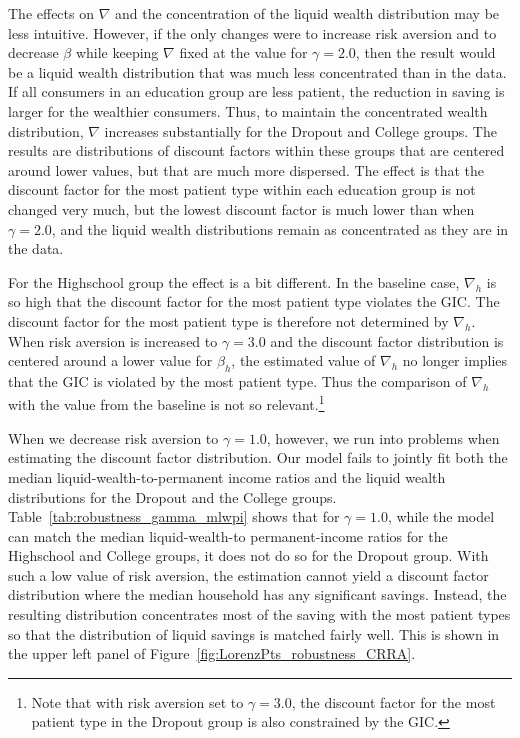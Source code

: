 \documentclass{econsocart}
\begin{document}
The effects on $\nabla$ and the concentration of the liquid wealth distribution may be less intuitive.
However, if the only changes were to increase risk aversion and to decrease $\beta$ while keeping $\nabla$ fixed at the value for $\gamma=2.0$, then the result would be a liquid wealth distribution that was much less concentrated than in the data.
If all consumers in an education group are less patient, the reduction in saving is larger for the wealthier consumers.
Thus, to maintain the concentrated wealth distribution, $\nabla$ increases substantially for the Dropout and College groups.
The results are distributions of discount factors within these groups that are centered around lower values, but that are much more dispersed.
The effect is that the discount factor for the most patient type within each education group is not changed very much, but the lowest discount factor is much lower than when $\gamma=2.0$, and the liquid wealth distributions remain as concentrated as they are in the data.

For the Highschool group the effect is a bit different.
In the baseline case, $\nabla_h$ is so high that the discount factor for the most patient type violates the GIC.
The discount factor for the most patient type is therefore not determined by $\nabla_h$.
When risk aversion is increased to $\gamma=3.0$ and the discount factor distribution is centered around a lower value for $\beta_h$, the estimated value of $\nabla_h$ no longer implies that the GIC is violated by the most patient type.
Thus the comparison of $\nabla_h$ with the value from the baseline is not so relevant.\footnote{Note that with risk aversion set to $\gamma=3.0$, the discount factor for the most patient type in the Dropout group is also constrained by the GIC.}

When we decrease risk aversion to $\gamma=1.0$, however, we run into problems when estimating the discount factor distribution.
Our model fails to jointly fit both the median liquid-wealth-to-permanent income ratios and the liquid wealth distributions for the Dropout and the College groups.
Table~\ref{tab:robustness_gamma_mlwpi} shows that for $\gamma=1.0$, while the model can match the median liquid-wealth-to permanent-income ratios for the Highschool and College groups, it does not do so for the Dropout group.
With such a low value of risk aversion, the estimation cannot yield a discount factor distribution where the median household has any significant savings.
Instead, the resulting distribution concentrates most of the saving with the most patient types so that the distribution of liquid savings is matched fairly well.
This is shown in the upper left panel of Figure~\ref{fig:LorenzPts_robustness_CRRA}.
\end{document}
